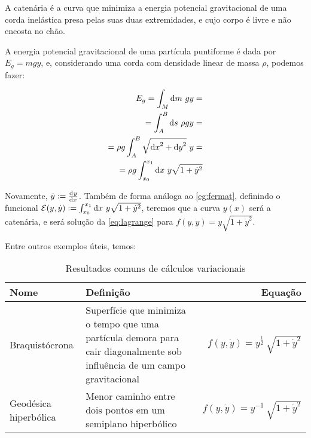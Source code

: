 \begin{eg}[Catenária]
    \label{eg:catenaria}
    A catenária é a curva que minimiza a energia potencial gravitacional de uma
    corda inelástica presa pelas suas duas extremidades, e cujo corpo é livre e
    não encosta no chão.

    A energia potencial gravitacional de uma partícula puntiforme é dada por
    $E_g = mgy$, e, considerando uma corda com densidade linear de massa $\rho$,
    podemos fazer:

    \begin{equation}
        \begin{aligned}
            E_g = \int_M \dif m ~ gy =& \\
            = \int_A^B \dif s~\rho gy =& \\
            = \rho g \int_A^B \sqrt{{\dif x}^2 + {\dif y}^2}~y =& \\
            = \rho g \int_{x_0}^{x_1} \dif x~y \sqrt{1 + {\dot y}^2}
        \end{aligned}
    \end{equation}

    Novamente, $\dot y := \tod{y}{x}$. Também de forma análoga ao
    \autoref{eg:fermat}, definindo o funcional $\mathcal{E}(y, \dot y) :=
    \int_{x_0}^{x_1} \dif x~y \sqrt{1 + {\dot y}^2}$, teremos que a curva $y(x)$
    será a catenária, e será solução da \autoref{eq:lagrange} para $f(y, \dot y)
    = y \sqrt{1 + {\dot y}^2}$.
\end{eg}

Entre outros exemplos úteis, temos:

\begin{table}[H]
    \centering
    \begin{tabularx}{\textwidth}{lXr}
        \toprule
        Nome & Definição & Equação \\
        \midrule
        Braquistócrona & %
            Superfície que minimiza o tempo que uma partícula demora para %
            cair diagonalmente sob influência de um campo gravitacional & %
            $f(y, \dot y) = y^{\frac{1}{2}}~\sqrt{1 + {\dot y}^2}$ \\ 
        Geodésica hiperbólica & %
            Menor caminho entre dois pontos em um semiplano hiperbólico & %
            $f(y, \dot y) = y^{-1}~\sqrt{1 + {\dot y}^2}$ \\
        \bottomrule
    \end{tabularx}
    \caption{Resultados comuns de cálculos variacionais}
    \label{tab:varcalc_eg}
\end{table}

